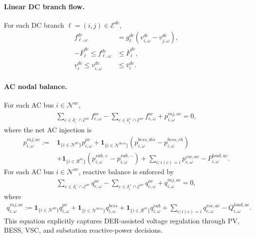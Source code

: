 \paragraph{Linear DC branch flow.}
For each DC branch \(\ell=(i,j)\in\mathcal{E}^{dc}\),
\begin{align}
f_{\ell,\omega}^{dc} &= g_\ell^{dc}(v_{i,\omega}^{dc}-v_{j,\omega}^{dc}),
\label{eq:10b-dc-flow}\\
-\overline F_\ell^{dc} \le f_{\ell,\omega}^{dc} &\le \overline F_\ell^{dc},
\label{eq:10b-dc-flow-bound}\\
\underline v_i^{dc} \le v_{i,\omega}^{dc} &\le \overline v_i^{dc}.
\label{eq:10b-dc-voltage-bound}
\end{align}

\paragraph{AC nodal balance.}
For each AC bus \(i\in\mathcal{N}^{ac}\),
\begin{align}
\sum_{e\in\delta_i^{-}\cap\mathcal{E}^{ac}} f_{e,\omega}^{ac}
- \sum_{e\in\delta_i^{+}\cap\mathcal{E}^{ac}} f_{e,\omega}^{ac}
+ p_{i,\omega}^{inj,ac} = 0,
\label{eq:10b-ac-balance}
\end{align}
where the net AC injection is
\begin{align}
p_{i,\omega}^{inj,ac} :=
&\mathbf{1}_{\{i\in\mathcal{N}^{pv}\}}p_{i,\omega}^{pv}
+ \mathbf{1}_{\{i\in\mathcal{N}^{bess}\}}\left(p_{i,\omega}^{bess,dis}-p_{i,\omega}^{bess,ch}\right) \\
&+ \mathbf{1}_{\{i\in\mathcal{R}^{ac}\}}\left(p_{i,\omega}^{sub,+}-p_{i,\omega}^{sub,-}\right)
+ \sum_{c:i(c)=i} p_{c,\omega}^{vsc,ac}
- P_{i,\omega}^{load,ac}.
\label{eq:10b-ac-net-injection}
\end{align}
For each AC bus \(i\in\mathcal{N}^{ac}\), reactive balance is enforced by
\begin{align}
\sum_{e\in\delta_i^{-}\cap\mathcal{E}^{ac}} q_{e,\omega}^{ac}
- \sum_{e\in\delta_i^{+}\cap\mathcal{E}^{ac}} q_{e,\omega}^{ac}
+ q_{i,\omega}^{inj,ac} = 0,
\label{eq:10b-ac-reactive-balance}
\end{align}
where
\begin{align}
q_{i,\omega}^{inj,ac} :=
\mathbf{1}_{\{i\in\mathcal{N}^{pv}\}} q_{i,\omega}^{pv}
+ \mathbf{1}_{\{i\in\mathcal{N}^{bess}\}} q_{i,\omega}^{bess}
+ \mathbf{1}_{\{i\in\mathcal{R}^{ac}\}} q_{i,\omega}^{sub}
+ \sum_{c:i(c)=i} q_{c,\omega}^{vsc,ac}
- Q_{i,\omega}^{load,ac}.
\label{eq:10b-ac-reactive-net-injection}
\end{align}
This equation explicitly captures DER-assisted voltage regulation through PV, BESS, VSC, and substation reactive-power decisions.

